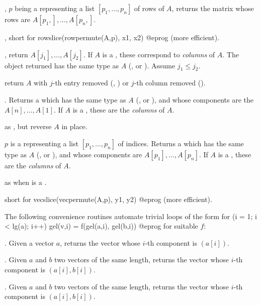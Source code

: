 , $p$ being a 
representing a list $[p_1,\dots,p_n]$ of rows of  $A$, returns the
matrix whose rows are $A[p_1,],\dots, A[p_n,]$.

, short for
\bprog
  rowslice(rowpermute(A,p), x1, x2)
@eprog\noindent
(more efficient).

, return $A[j_1], \dots,
A[j_2]$. If $A$ is a , these correspond to \emph{columns} of $A$.
The object returned has the same type as $A$ (,  or
). Assume $j_1 \leq j_2$.

 return $A$ with $j$-th entry removed
(, ) or $j$-th column removed ().

. Returns a  which has the same
type as $A$ (,  or ), and whose components
are the $A[n],\dots,A[1]$. If $A$ is a , these are the
\emph{columns} of $A$.

 as , but reverse
$A$ in place.

 $p$ is a  representing
a list $[p_1,\dots,p_n]$ of indices. Returns a  which has the same
type as $A$ (,  or ), and whose components
are $A[p_1],\dots,A[p_n]$. If $A$ is a , these are the
\emph{columns} of $A$.

 as  when  is a
.

 short for
\bprog
  vecslice(vecpermute(A,p), y1, y2)
@eprog\noindent
(more efficient).


The following convenience routines automate trivial loops of the form
\bprog
  for (i = 1; i < lg(a); i++) gel(v,i) = f(gel(a,i), gel(b,i))
@eprog\noindent
for suitable $f$:

. Given a vector $a$,
returns the vector whose $i$-th component is $(a[i])$.

. Given $a$ and $b$ two vectors of the same
length, returns the vector whose $i$-th component is $(a[i], b[i])$.

. Given $a$ and $b$ two vectors of the same
length, returns the vector whose $i$-th component is $(a[i], b[i])$.

